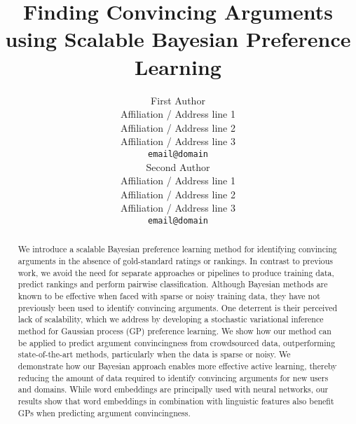 \documentclass[11pt,letterpaper]{article}
\title{ 
Finding Convincing Arguments using Scalable Bayesian Preference Learning
}
\author{First Author \\
  Affiliation / Address line 1 \\
  Affiliation / Address line 2 \\
  Affiliation / Address line 3 \\
  {\tt email@domain} \\\And
  Second Author \\
  Affiliation / Address line 1 \\
  Affiliation / Address line 2 \\
  Affiliation / Address line 3 \\
  {\tt email@domain} \\}
\date{}
\begin{document}
\maketitle


\begin{abstract}
We introduce a scalable Bayesian preference learning method for identifying
convincing arguments in the absence of gold-standard ratings or rankings.
In contrast to previous work, we avoid the need for separate approaches or pipelines
to produce training data, predict rankings and perform pairwise classification.
Although Bayesian methods are known to be effective when faced with sparse or noisy training data, 
they have not previously been used to identify convincing arguments.
One deterrent is their perceived lack of scalability, which we address by developing a 
stochastic variational inference method for Gaussian process (GP) preference learning.
We show how our method can be applied to predict argument convincingness from crowdsourced data, 
outperforming state-of-the-art methods, particularly when the data is sparse or noisy.  
We demonstrate how our Bayesian approach enables more effective active learning,
thereby reducing the amount of data required to identify convincing arguments for new users and domains.
While word embeddings are principally used with neural networks, our results show that word embeddings in combination with linguistic features also benefit GPs when predicting
argument convincingness.


\end{abstract}
\end{document}
